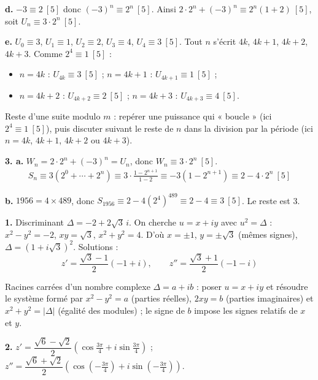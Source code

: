 \documentclass[11pt]{article}
\begin{document}
\textbf{d.} $-3 \equiv 2\ [5]$ donc $(-3)^n \equiv 2^n\ [5]$. Ainsi $2\cdot 2^n + (-3)^n \equiv 2^n(1+2)\ [5]$, soit $U_n \equiv 3\cdot 2^n\ [5]$.

\textbf{e.} $U_0 \equiv 3$, $U_1 \equiv 1$, $U_2 \equiv 2$, $U_3 \equiv 4$, $U_4 \equiv 3\ [5]$. Tout $n$ s'écrit $4k$, $4k+1$, $4k+2$, $4k+3$. Comme $2^4 \equiv 1\ [5]$ :
\begin{itemize}
  \item $n = 4k$ : $U_{4k} \equiv 3\ [5]$ ; \quad $n = 4k+1$ : $U_{4k+1} \equiv 1\ [5]$ ;
  \item $n = 4k+2$ : $U_{4k+2} \equiv 2\ [5]$ ; \quad $n = 4k+3$ : $U_{4k+3} \equiv 4\ [5]$.
\end{itemize}

\begin{methode}
Reste d'une suite modulo $m$ : repérer une puissance qui « boucle »
(ici $2^4 \equiv 1\ [5]$), puis discuter suivant le reste de $n$ dans
la division par la période (ici $n = 4k$, $4k+1$, $4k+2$ ou $4k+3$).
\end{methode}

\textbf{3. a.} $W_n = 2\cdot 2^n + (-3)^n = U_n$, donc $W_n \equiv 3\cdot 2^n\ [5]$.
\begin{align*}
S_n \equiv 3(2^0 + \cdots + 2^n) \equiv 3\cdot\frac{1 - 2^{n+1}}{1 - 2} \equiv -3(1 - 2^{n+1}) \equiv 2 - 4\cdot 2^n\ [5]
\end{align*}

\textbf{b.} $1956 = 4\times489$, donc $S_{1956} \equiv 2 - 4(2^4)^{489} \equiv 2 - 4 \equiv 3\ [5]$. Le reste est 3.


\textbf{1.} Discriminant $\Delta = -2 + 2\sqrt{3}\,i$. On cherche $u = x + iy$ avec $u^2 = \Delta$ : $x^2 - y^2 = -2$, $xy = \sqrt{3}$, $x^2 + y^2 = 4$. D'où $x = \pm1$, $y = \pm\sqrt{3}$ (mêmes signes), $\Delta = (1 + i\sqrt{3})^2$. Solutions :
\[ z' = \frac{\sqrt{3} - 1}{2}(-1 + i), \qquad z'' = \frac{\sqrt{3} + 1}{2}(-1 - i) \]

\begin{methode}
Racines carrées d'un nombre complexe $\Delta = a + ib$ : poser
$u = x + iy$ et résoudre le système formé par $x^2 - y^2 = a$ (parties
réelles), $2xy = b$ (parties imaginaires) et $x^2 + y^2 = |\Delta|$
(égalité des modules) ; le signe de $b$ impose les signes relatifs de
$x$ et $y$.
\end{methode}

\textbf{2.} $z' = \dfrac{\sqrt{6} - \sqrt{2}}{2}\left(\cos\tfrac{3\pi}{4} + i\sin\tfrac{3\pi}{4}\right)$ ; \quad $z'' = \dfrac{\sqrt{6} + \sqrt{2}}{2}\left(\cos\left(-\tfrac{3\pi}{4}\right) + i\sin\left(-\tfrac{3\pi}{4}\right)\right)$.
\end{document}
